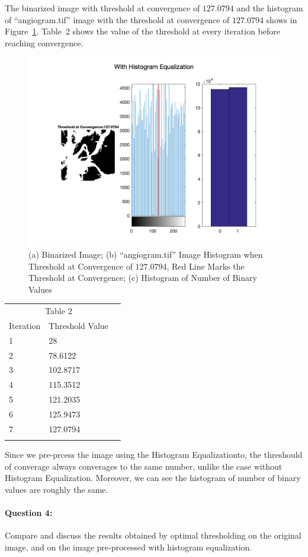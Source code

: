 \documentclass[12pt, letter]{article}
\begin{document}
The binarized image with threshold at convergence of $\mathbf{127.0794}$ and the histogram of ``angiogram.tif'' image with the threshold at convergence of $\mathbf{127.0794}$ shows in Figure~\ref{fig:q3-1}. Table~2 shows the value of the threshold at every iteration before reaching convergence.

\begin{figure}
    \centering
    \includegraphics[width=14cm]{with-histogram-equalization.png}
    \caption{(a) Binarized Image; (b) ``angiogram.tif'' Image Histogram when Threshold at Convergence of 127.0794, Red Line Marks the Threshold at Convergence; (c) Histogram of Number of Binary Values}
    \label{fig:q3-1}
\end{figure}

\begin{center}
\begin{tabular}{llr}  
\toprule
\multicolumn{2}{c}{Table 2} \\
\cmidrule(r){1-2}
Iteration   & Threshold Value \\
\midrule
1 & 28 \\
2 & 78.6122 \\
3 & 102.8717 \\
4 & 115.3512 \\
5 & 121.2035 \\
6 & 125.9473 \\
7 & 127.0794 \\

\bottomrule
\label{table:q2-2}
\end{tabular}    
\end{center}

Since we pre-prcess the image using the Histogram Equalizationto, the threshould of converage always converages to the same number, unlike the case without Histogram Equalization. Moreover, we can see the histogram of number of binary values are roughly the same. 

\paragraph{Question 4: } Compare and discuss the results obtained by optimal thresholding on the original image, and on the image pre-processed with histogram equalization.
\end{document}
